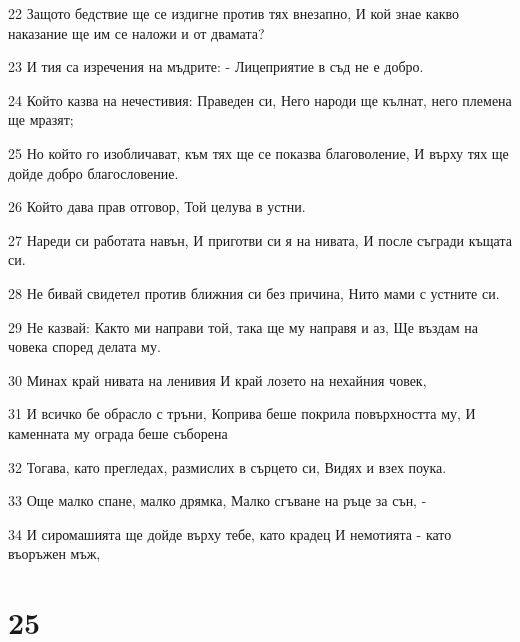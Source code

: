 \par 22 Защото бедствие ще се издигне против тях внезапно, И кой знае какво наказание ще им се наложи и от двамата?
\par 23 И тия са изречения на мъдрите: - Лицеприятие в съд не е добро.
\par 24 Който казва на нечестивия: Праведен си, Него народи ще кълнат, него племена ще мразят;
\par 25 Но който го изобличават, към тях ще се показва благоволение, И върху тях ще дойде добро благословение.
\par 26 Който дава прав отговор, Той целува в устни.
\par 27 Нареди си работата навън, И приготви си я на нивата, И после съгради къщата си.
\par 28 Не бивай свидетел против ближния си без причина, Нито мами с устните си.
\par 29 Не казвай: Както ми направи той, така ще му направя и аз, Ще въздам на човека според делата му.
\par 30 Минах край нивата на ленивия И край лозето на нехайния човек,
\par 31 И всичко бе обрасло с тръни, Коприва беше покрила повърхността му, И каменната му ограда беше съборена
\par 32 Тогава, като прегледах, размислих в сърцето си, Видях и взех поука.
\par 33 Още малко спане, малко дрямка, Малко сгъване на ръце за сън, -
\par 34 И сиромашията ще дойде върху тебе, като крадец И немотията - като въоръжен мъж,

\chapter{25}


